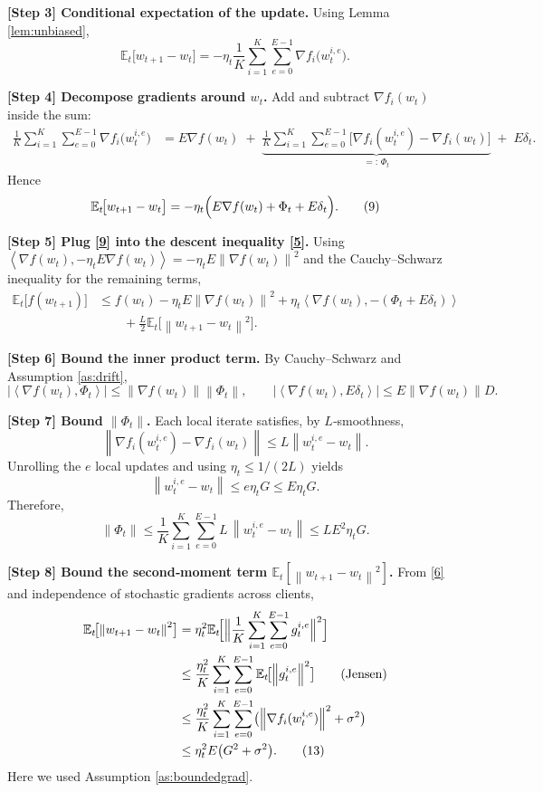 \documentclass{article}
\newcommand{\E}{\mathbb{E}}
\newcommand{\norm}[1]{\left\lVert #1 \right\rVert}
\newcommand{\inner}[2]{\left\langle #1, #2 \right\rangle}
\newcommand{\grad}{\nabla}
\begin{document}
\bigskip
\noindent\textbf{[Step 3] Conditional expectation of the update.}  
Using Lemma \ref{lem:unbiased},
\[
\E_t\!\bigl[w_{t+1}-w_t\bigr]
= -\eta_t\frac1K\sum_{i=1}^K\sum_{e=0}^{E-1}\grad f_i\!\bigl(w_{t}^{i,e}\bigr).
\tag{7}
\]

\bigskip
\noindent\textbf{[Step 4] Decompose gradients around $w_t$.}  
Add and subtract $\grad f_i(w_t)$ inside the sum:
\begin{align}
\frac1K\sum_{i=1}^K\sum_{e=0}^{E-1}\grad f_i\!\bigl(w_{t}^{i,e}\bigr)
&=
E\grad f(w_t) \;+\; \underbrace{\frac1K\sum_{i=1}^K\sum_{e=0}^{E-1}
\bigl[\grad f_i(w_{t}^{i,e})-\grad f_i(w_t)\bigr]}_{\displaystyle=:\,\Phi_t}
\;+\;E\delta_t .
\tag{8}
\end{align}
Hence
\[
\E_t\!\bigl[w_{t+1}-w_t\bigr]
= -\eta_t\Bigl(E\grad f(w_t)+\Phi_t+E\delta_t\Bigr).
\tag{9}
\]

\bigskip
\noindent\textbf{[Step 5] Plug \eqref{9} into the descent inequality \eqref{5}.}  
Using $\inner{\grad f(w_t)}{-\eta_tE\grad f(w_t)}=-\eta_tE\norm{\grad f(w_t)}^2$ and the Cauchy–Schwarz inequality for the remaining terms,
\begin{align}
\E_t\!\bigl[f(w_{t+1})\bigr]
&\le f(w_t)-\eta_tE\norm{\grad f(w_t)}^2
   +\eta_t\inner{\grad f(w_t)}{-(\Phi_t+E\delta_t)} \nonumber\\
&\qquad
   +\frac{L}{2}\E_t\!\bigl[\norm{w_{t+1}-w_t}^2\bigr].
\tag{10}
\end{align}

\bigskip
\noindent\textbf{[Step 6] Bound the inner product term.}  
By Cauchy–Schwarz and Assumption \ref{as:drift},
\[
\bigl|\inner{\grad f(w_t)}{\Phi_t}\bigr|
\le \norm{\grad f(w_t)}\norm{\Phi_t}, \qquad
\bigl|\inner{\grad f(w_t)}{E\delta_t}\bigr|
\le E\norm{\grad f(w_t)}D .
\tag{11}
\]

\bigskip
\noindent\textbf{[Step 7] Bound $\norm{\Phi_t}$.}  
Each local iterate satisfies, by $L$‑smoothness,
\[
\norm{\grad f_i(w_{t}^{i,e})-\grad f_i(w_t)}\le L\norm{w_{t}^{i,e}-w_t}.
\]
Unrolling the $e$ local updates and using $\eta_t\le 1/(2L)$ yields
\[
\norm{w_{t}^{i,e}-w_t}\le e\eta_t G \le E\eta_t G .
\]
Therefore,
\[
\norm{\Phi_t}
\le \frac1K\sum_{i=1}^K\sum_{e=0}^{E-1} L\,\norm{w_{t}^{i,e}-w_t}
\le L E^2 \eta_t G .
\tag{12}
\]

\bigskip
\noindent\textbf{[Step 8] Bound the second‑moment term $\E_t[\norm{w_{t+1}-w_t}^2]$.}  
From \eqref{6} and independence of stochastic gradients across clients,
\begin{align}
\E_t\!\bigl[\norm{w_{t+1}-w_t}^2\bigr]
&= \eta_t^2 \E_t\!\Bigl[
   \Bigl\|\frac1K\sum_{i=1}^K\sum_{e=0}^{E-1} g_{t}^{i,e}\Bigr\|^2\Bigr] \nonumber\\
&\le \frac{\eta_t^2}{K}\sum_{i=1}^K\sum_{e=0}^{E-1}
   \E_t\!\bigl[\norm{g_{t}^{i,e}}^2\bigr] \qquad\text{(Jensen)} \nonumber\\
&\le \frac{\eta_t^2}{K}\sum_{i=1}^K\sum_{e=0}^{E-1}
   \bigl( \norm{\grad f_i(w_{t}^{i,e})}^2+\sigma^2 \bigr) \nonumber\\
&\le \eta_t^2 E\bigl(G^2+\sigma^2\bigr) .
\tag{13}
\end{align}
Here we used Assumption \ref{as:boundedgrad}.
\end{document}
